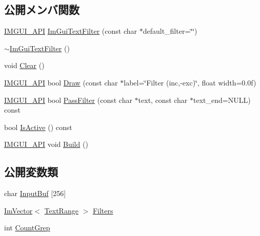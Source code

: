 \subsection*{公開メンバ関数}
\begin{DoxyCompactItemize}
\item 
\mbox{\hyperlink{imgui_8h_a43829975e84e45d1149597467a14bbf5}{I\+M\+G\+U\+I\+\_\+\+A\+PI}} \mbox{\hyperlink{struct_im_gui_text_filter_a0a61ee76f0b4f3c354791734b06e3140}{Im\+Gui\+Text\+Filter}} (const char $\ast$default\+\_\+filter=\char`\"{}\char`\"{})
\item 
\mbox{\hyperlink{struct_im_gui_text_filter_acaf7fdcdc879c7938d195714609aac87}{$\sim$\+Im\+Gui\+Text\+Filter}} ()
\item 
void \mbox{\hyperlink{struct_im_gui_text_filter_a9043c1f0c33d29e6fc9b75ae81f9705a}{Clear}} ()
\item 
\mbox{\hyperlink{imgui_8h_a43829975e84e45d1149597467a14bbf5}{I\+M\+G\+U\+I\+\_\+\+A\+PI}} bool \mbox{\hyperlink{struct_im_gui_text_filter_ab93ad5985019ff9d3781606551fc26cc}{Draw}} (const char $\ast$label=\char`\"{}Filter (inc,-\/exc)\char`\"{}, float width=0.\+0f)
\item 
\mbox{\hyperlink{imgui_8h_a43829975e84e45d1149597467a14bbf5}{I\+M\+G\+U\+I\+\_\+\+A\+PI}} bool \mbox{\hyperlink{struct_im_gui_text_filter_a88d73ff8b81fbbd0a129b1bf3498d8aa}{Pass\+Filter}} (const char $\ast$text, const char $\ast$text\+\_\+end=N\+U\+LL) const
\item 
bool \mbox{\hyperlink{struct_im_gui_text_filter_a493158f2ab8f45fcf303c3f953be9b88}{Is\+Active}} () const
\item 
\mbox{\hyperlink{imgui_8h_a43829975e84e45d1149597467a14bbf5}{I\+M\+G\+U\+I\+\_\+\+A\+PI}} void \mbox{\hyperlink{struct_im_gui_text_filter_aef362baafaa9dfa62d11bc6101c0f4c1}{Build}} ()
\end{DoxyCompactItemize}
\subsection*{公開変数類}
\begin{DoxyCompactItemize}
\item 
char \mbox{\hyperlink{struct_im_gui_text_filter_ad070acb1038199dd4e8f5d010c5cb5ba}{Input\+Buf}} \mbox{[}256\mbox{]}
\item 
\mbox{\hyperlink{class_im_vector}{Im\+Vector}}$<$ \mbox{\hyperlink{struct_im_gui_text_filter_1_1_text_range}{Text\+Range}} $>$ \mbox{\hyperlink{struct_im_gui_text_filter_a5a930a339a9384e6bfadfa56a7c111fd}{Filters}}
\item 
int \mbox{\hyperlink{struct_im_gui_text_filter_ac31839c319fe4211c21fc143b7249f86}{Count\+Grep}}
\end{DoxyCompactItemize}


